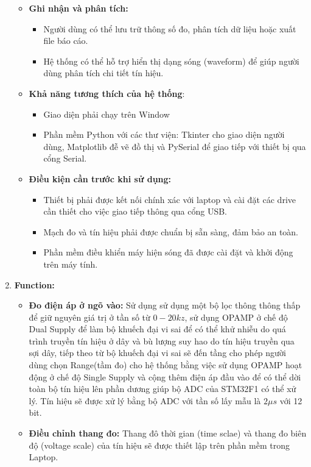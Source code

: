 \begin{enumerate}[label=\alph*)]
\begin{itemize}[label=-]
\begin{itemize}[label=+]
		\end{itemize}
		\item \textbf{Ghi nhận và phân tích:} 
		\begin{itemize}[label=+]
			\item Người dùng có thể lưu trữ thông số đo, phân tích dữ liệu hoặc xuất file báo cáo.
			\item Hệ thống có thể hỗ trợ hiển thị dạng sóng (waveform) để giúp người dùng phân tích chi tiết tín hiệu.
		\end{itemize}
		\item \textbf{Khả năng tương thích của hệ thống}:
		\begin{itemize}[label=+]
			\item Giao diện phải chạy trên Window
			\item Phần mềm Python với các thư viện: Tkinter cho giao diện người dùng, Matplotlib đễ vẽ đồ thị và PySerial để giao tiếp với thiết bị qua cổng Serial.
		\end{itemize}
		\item \textbf{Điều kiện cần trước khi sử dụng:}
		\begin{itemize}[label=+]
			\item Thiết bị phải được kết nối chính xác với laptop và cài đặt các drive cần thiết cho việc giao tiếp thông qua cổng USB.
			\item Mạch đo và tín hiệu phải được chuẩn bị sẵn sàng, đảm bảo an toàn.
			\item Phần mềm điều khiển máy hiện sóng đã được cài đặt và khởi động trên máy tính.
		\end{itemize}
	\end{itemize}
	\item \textbf{Function:}
	\begin{itemize}[label=-]
		\item \textbf{Đo điện áp ở ngõ vào:} Sử dụng sử dụng một bộ lọc thông thông thấp để giữ nguyên giá trị ở tần số từ $0-20kz$, sử dụng OPAMP ở chế độ Dual Supply để làm bộ khuếch đại vi sai để có thể khử nhiễu do quá trình truyền tín hiệu ở dây và bù lượng suy hao do tín hiệu truyền qua sợi dây, tiếp theo từ bộ khuếch đại vi sai sẽ đến tầng cho phép người dùng chọn Range(tầm đo) cho hệ thống bằng việc sử dụng OPAMP hoạt động ở chế độ Single Supply và cộng thêm điện áp đầu vào để có thể dời toàn bộ tín hiệu lên phần dương giúp bộ ADC của STM32F1 có thể xử lý. Tín hiệu sẽ được xử lý bằng bộ ADC với tần số lấy mẫu là $2\mu s$ với 12 bit.
		\item \textbf{Điều chỉnh thang đo:} Thang đô thời gian (time sclae) và thang đo biên độ (voltage scale) của tín hiệu sẽ được thiết lập trên phần mềm trong Laptop.

\end{itemize}
\end{enumerate}

